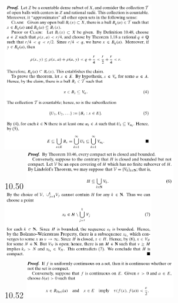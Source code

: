 \documentclass[3pt,landscape]{article}
\begin{document}
\begin{multicols}{3}
    \includegraphics[width=250]{10_49.png} \\
    10.50
    \includegraphics[width=250]{10_50a.png} \\
    \includegraphics[width=250]{10_50b.png} \\
    10.52
    \includegraphics[width=250]{10_52a.png} \\

\end{multicols}
\end{document}
